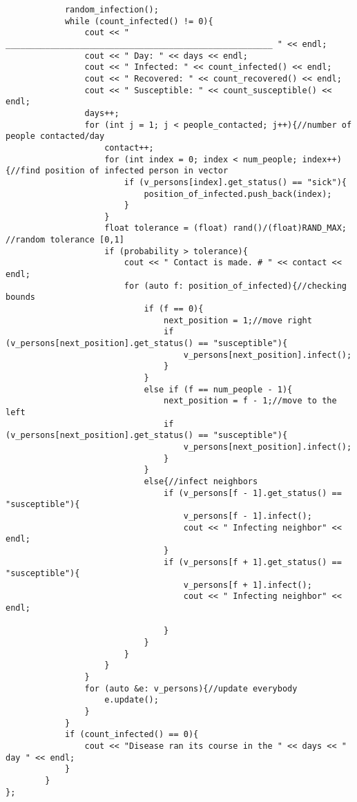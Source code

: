 \documentclass[paper=a4, fontsize=11pt]{scrartcl}
\begin{document}
\begin{lstlisting}
            random_infection();
            while (count_infected() != 0){
                cout << " ______________________________________________________ " << endl;
                cout << " Day: " << days << endl;
                cout << " Infected: " << count_infected() << endl;
                cout << " Recovered: " << count_recovered() << endl;
                cout << " Susceptible: " << count_susceptible() << endl;
                days++;
                for (int j = 1; j < people_contacted; j++){//number of people contacted/day
                    contact++;
                    for (int index = 0; index < num_people; index++){//find position of infected person in vector
                        if (v_persons[index].get_status() == "sick"){
                            position_of_infected.push_back(index);
                        }
                    }
                    float tolerance = (float) rand()/(float)RAND_MAX; //random tolerance [0,1]
                    if (probability > tolerance){
                        cout << " Contact is made. # " << contact << endl; 
                        for (auto f: position_of_infected){//checking bounds
                            if (f == 0){
                                next_position = 1;//move right
                                if (v_persons[next_position].get_status() == "susceptible"){
                                    v_persons[next_position].infect();
                                }
                            }
                            else if (f == num_people - 1){
                                next_position = f - 1;//move to the left
                                if (v_persons[next_position].get_status() == "susceptible"){
                                    v_persons[next_position].infect();
                                }
                            }
                            else{//infect neighbors 
                                if (v_persons[f - 1].get_status() == "susceptible"){
                                    v_persons[f - 1].infect();
                                    cout << " Infecting neighbor" << endl;
                                }
                                if (v_persons[f + 1].get_status() == "susceptible"){
                                    v_persons[f + 1].infect();
                                    cout << " Infecting neighbor" << endl;

                                }
                            }
                        }
                    }
                }
                for (auto &e: v_persons){//update everybody
                    e.update();
                }
            }
            if (count_infected() == 0){
                cout << "Disease ran its course in the " << days << " day " << endl;
            }
        }
};


\end{lstlisting}
\end{document}
